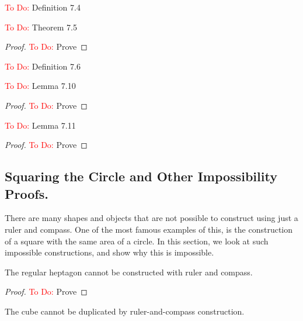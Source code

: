 \begin{definition}
    \textcolor{red}{To Do:} Definition 7.4
\end{definition}

\begin{theorem}
    \textcolor{red}{To Do:} Theorem 7.5
\end{theorem}

\begin{proof}  
    \textcolor{red}{To Do:} Prove
\end{proof}

\begin{definition}
    \textcolor{red}{To Do:} Definition 7.6
\end{definition}

\begin{lemma}
    \textcolor{red}{To Do:} Lemma 7.10
\end{lemma}

\begin{proof}  
    \textcolor{red}{To Do:} Prove
\end{proof}

\begin{lemma}
    \textcolor{red}{To Do:} Lemma 7.11
\end{lemma}

\begin{proof}  
    \textcolor{red}{To Do:} Prove
\end{proof}

\subsection{Squaring the Circle and Other Impossibility Proofs.}

There are many shapes and objects that are not possible to construct using just a ruler and compass. One of the most famous examples of this, is the construction of a square with the same area of a circle. In this section, we look at such impossible constructions, and show why this is impossible.

\begin{theorem}
    The regular heptagon cannot be constructed with ruler and compass.
\end{theorem}

\begin{proof}
    \textcolor{red}{To Do:} Prove
\end{proof}

\begin{theorem}
    The cube cannot be duplicated by ruler-and-compass construction.
\end{theorem}

